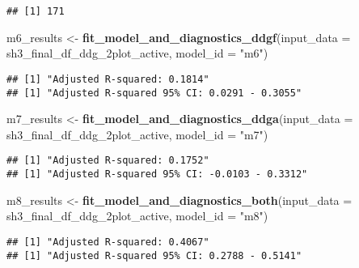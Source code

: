 \documentclass[
]{article}
\newenvironment{Shaded}{\begin{snugshade}}{\end{snugshade}}
\newcommand{\AttributeTok}[1]{\textcolor[rgb]{0.13,0.29,0.53}{#1}}
\newcommand{\FunctionTok}[1]{\textcolor[rgb]{0.13,0.29,0.53}{\textbf{#1}}}
\newcommand{\NormalTok}[1]{#1}
\newcommand{\OtherTok}[1]{\textcolor[rgb]{0.56,0.35,0.01}{#1}}
\newcommand{\SpecialCharTok}[1]{\textcolor[rgb]{0.81,0.36,0.00}{\textbf{#1}}}
\newcommand{\StringTok}[1]{\textcolor[rgb]{0.31,0.60,0.02}{#1}}
\begin{document}
\begin{verbatim}
## [1] 171
\end{verbatim}

\begin{Shaded}
\begin{Highlighting}[]
\NormalTok{m6\_results }\OtherTok{\textless{}{-}} \FunctionTok{fit\_model\_and\_diagnostics\_ddgf}\NormalTok{(}\AttributeTok{input\_data =}\NormalTok{ sh3\_final\_df\_ddg\_2plot\_active, }\AttributeTok{model\_id =} \StringTok{"m6"}\NormalTok{)}
\end{Highlighting}
\end{Shaded}

\begin{verbatim}
## [1] "Adjusted R-squared: 0.1814"
## [1] "Adjusted R-squared 95% CI: 0.0291 - 0.3055"
\end{verbatim}

\begin{Shaded}
\begin{Highlighting}[]
\NormalTok{m7\_results }\OtherTok{\textless{}{-}} \FunctionTok{fit\_model\_and\_diagnostics\_ddga}\NormalTok{(}\AttributeTok{input\_data =}\NormalTok{ sh3\_final\_df\_ddg\_2plot\_active, }\AttributeTok{model\_id =} \StringTok{"m7"}\NormalTok{)}
\end{Highlighting}
\end{Shaded}

\begin{verbatim}
## [1] "Adjusted R-squared: 0.1752"
## [1] "Adjusted R-squared 95% CI: -0.0103 - 0.3312"
\end{verbatim}

\begin{Shaded}
\begin{Highlighting}[]
\NormalTok{m8\_results }\OtherTok{\textless{}{-}} \FunctionTok{fit\_model\_and\_diagnostics\_both}\NormalTok{(}\AttributeTok{input\_data =}\NormalTok{ sh3\_final\_df\_ddg\_2plot\_active, }\AttributeTok{model\_id =} \StringTok{"m8"}\NormalTok{)}
\end{Highlighting}
\end{Shaded}

\begin{verbatim}
## [1] "Adjusted R-squared: 0.4067"
## [1] "Adjusted R-squared 95% CI: 0.2788 - 0.5141"
\end{verbatim}

\begin{Shaded}
\end{Shaded}
\end{document}
